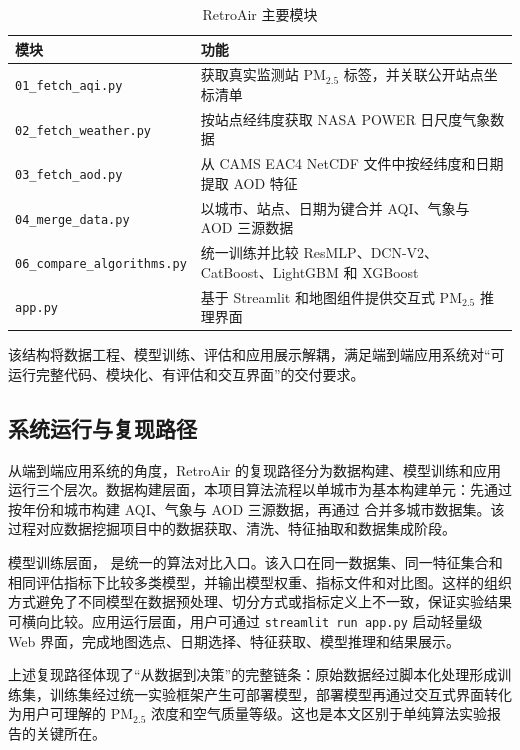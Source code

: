 ﻿\documentclass[UTF8,zihao=-4,a4paper]{ctexart}
\newcommand{\pmfine}{PM$_{2.5}$}
\newcommand{\aod}{AOD}
\begin{document}
\begin{table}[H]
  \centering
  \caption{RetroAir 主要模块}
  \label{tab:modules}
  \begin{tabularx}{\textwidth}{lX}
    \toprule
    模块 & 功能 \\
    \midrule
    \texttt{01\_fetch\_aqi.py} & 获取真实监测站 \pmfine{} 标签，并关联公开站点坐标清单 \\
    \texttt{02\_fetch\_weather.py} & 按站点经纬度获取 NASA POWER 日尺度气象数据 \\
    \texttt{03\_fetch\_aod.py} & 从 CAMS EAC4 NetCDF 文件中按经纬度和日期提取 \aod{} 特征 \\
    \texttt{04\_merge\_data.py} & 以城市、站点、日期为键合并 AQI、气象与 \aod{} 三源数据 \\
    \texttt{06\_compare\_algorithms.py} & 统一训练并比较 ResMLP、DCN-V2、CatBoost、LightGBM 和 XGBoost \\
    \texttt{app.py} & 基于 Streamlit 和地图组件提供交互式 \pmfine{} 推理界面 \\
    \bottomrule
  \end{tabularx}
\end{table}

该结构将数据工程、模型训练、评估和应用展示解耦，满足端到端应用系统对“可运行完整代码、模块化、有评估和交互界面”的交付要求。

\subsection{系统运行与复现路径}

从端到端应用系统的角度，RetroAir 的复现路径分为数据构建、模型训练和应用运行三个层次。数据构建层面，本项目算法流程以单城市为基本构建单元：先通过  按年份和城市构建 AQI、气象与 \aod{} 三源数据，再通过  合并多城市数据集。该过程对应数据挖掘项目中的数据获取、清洗、特征抽取和数据集成阶段。

模型训练层面， 是统一的算法对比入口。该入口在同一数据集、同一特征集合和相同评估指标下比较多类模型，并输出模型权重、指标文件和对比图。这样的组织方式避免了不同模型在数据预处理、切分方式或指标定义上不一致，保证实验结果可横向比较。应用运行层面，用户可通过 \texttt{streamlit run app.py} 启动轻量级 Web 界面，完成地图选点、日期选择、特征获取、模型推理和结果展示。

上述复现路径体现了“从数据到决策”的完整链条：原始数据经过脚本化处理形成训练集，训练集经过统一实验框架产生可部署模型，部署模型再通过交互式界面转化为用户可理解的 \pmfine{} 浓度和空气质量等级。这也是本文区别于单纯算法实验报告的关键所在。
\end{document}
